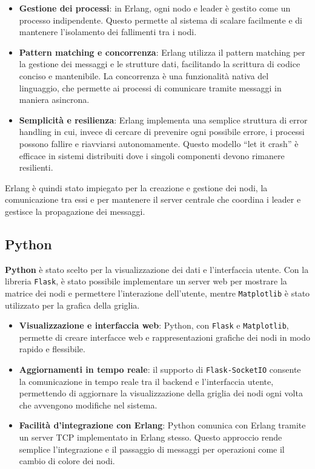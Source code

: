 \documentclass[12pt, a4paper]{report}
\begin{document}
\begin{itemize}
    \item \textbf{Gestione dei processi}: in Erlang, ogni nodo e leader \`e gestito come un processo indipendente. Questo permette al sistema di scalare facilmente e di mantenere l'isolamento dei fallimenti tra i nodi.
    \item \textbf{Pattern matching e concorrenza}: Erlang utilizza il pattern matching per la gestione dei messaggi e le strutture dati, facilitando la scrittura di codice conciso e mantenibile. La concorrenza \`e una funzionalità nativa del linguaggio, che permette ai processi di comunicare tramite messaggi in maniera asincrona.
    \item \textbf{Semplicità e resilienza}: Erlang implementa una semplice struttura di error handling in cui, invece di cercare di prevenire ogni possibile errore, i processi possono fallire e riavviarsi autonomamente. Questo modello “let it crash” \`e efficace in sistemi distribuiti dove i singoli componenti devono rimanere resilienti.
\end{itemize}

Erlang \`e quindi stato impiegato per la creazione e gestione dei nodi, la comunicazione tra essi e per mantenere il server centrale che coordina i leader e gestisce la propagazione dei messaggi.

\subsection{Python}

\textbf{Python} \`e stato scelto per la visualizzazione dei dati e l’interfaccia utente. Con la libreria \texttt{Flask}, \`e stato possibile implementare un server web per mostrare la matrice dei nodi e permettere l'interazione dell'utente, mentre \texttt{Matplotlib} \`e stato utilizzato per la grafica della griglia.

\newpage
\begin{itemize}
    \item \textbf{Visualizzazione e interfaccia web}: Python, con \texttt{Flask} e \texttt{Matplotlib}, permette di creare interfacce web e rappresentazioni grafiche dei nodi in modo rapido e flessibile.
    \item \textbf{Aggiornamenti in tempo reale}: il supporto di \texttt{Flask-SocketIO} consente la comunicazione in tempo reale tra il backend e l'interfaccia utente, permettendo di aggiornare la visualizzazione della griglia dei nodi ogni volta che avvengono modifiche nel sistema.
    \item \textbf{Facilità d'integrazione con Erlang}: Python comunica con Erlang tramite un server TCP implementato in Erlang stesso. Questo approccio rende semplice l'integrazione e il passaggio di messaggi per operazioni come il cambio di colore dei nodi.
\end{itemize}
\end{document}
